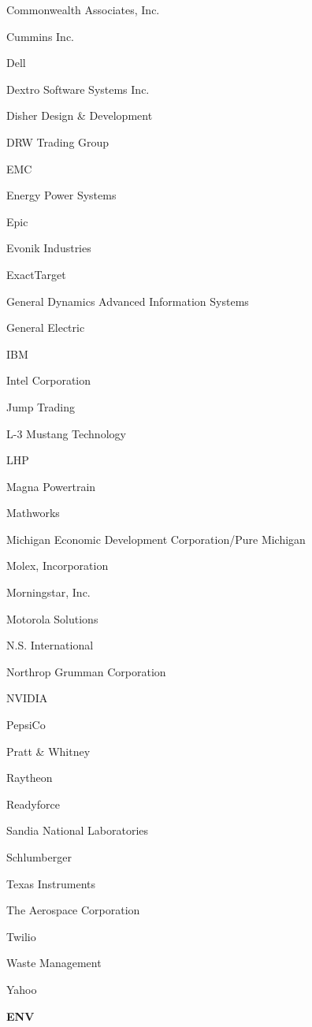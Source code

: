 \documentclass[twoside]{article}
\begin{document}
\begin{center}
\begin{multicols}{5}
\begin{FlushLeft}
\begin{compactitem}
\item Commonwealth Associates, Inc.
\item Cummins Inc.
\item Dell
\item Dextro Software Systems Inc.
\item Disher Design \& Development
\item DRW Trading Group
\item EMC
\item Energy Power Systems
\item Epic
\item Evonik Industries
\item ExactTarget
\item General Dynamics Advanced Information Systems
\item General Electric
\item IBM
\item Intel Corporation
\item Jump Trading
\item L-3 Mustang Technology
\item LHP
\item Magna Powertrain
\item Mathworks
\item Michigan Economic Development Corporation/Pure Michigan
\item Molex, Incorporation
\item Morningstar, Inc.
\item Motorola Solutions
\item N.S. International
\item Northrop Grumman Corporation
\item NVIDIA
\item PepsiCo
\item Pratt \& Whitney
\item Raytheon
\item Readyforce
\item Sandia National Laboratories
\item Schlumberger
\item Texas Instruments
\item The Aerospace Corporation
\item Twilio
\item Waste Management
\item Yahoo
\end{compactitem}
        \end{FlushLeft}
        \vspace{1em}
        {\fontsize{14}{16}\selectfont \bf ENV}\\

\end{multicols}
\end{center}
\end{document}

